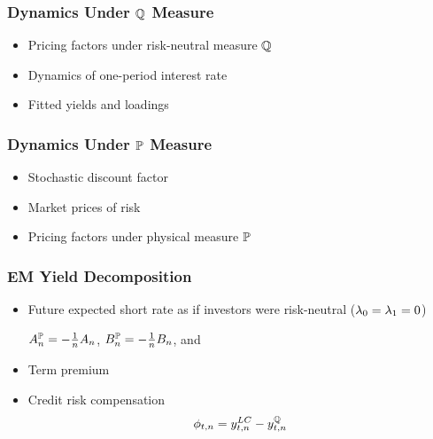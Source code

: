 \documentclass[12pt, aspectratio=169, xcolor=dvipsnames]{beamer}  %
\begin{document}
\begin{frame}[label=Qdynamics]
\frametitle{Dynamics Under \(\mathbb{Q}\) Measure}
\begin{itemize}
	\item Pricing factors under risk-neutral measure \(\mathbb{Q}\)
	
	\item Dynamics of one-period interest rate
	
	\item Fitted yields and loadings
	
\end{itemize}
\end{frame}

\begin{frame}[label=Pdynamics]
\frametitle{Dynamics Under \(\mathbb{P}\) Measure}
\begin{itemize}
\item Stochastic discount factor

\item Market prices of risk

\item Pricing factors under physical measure \(\mathbb{P}\)

\end{itemize}
\end{frame}

\begin{frame}[label=Components]
\frametitle{EM Yield Decomposition}
\begin{itemize}
\item Future expected short rate as if investors were risk-neutral (\(\lambda_{0} = \lambda_{1} = 0\))

\(A_{n}^{\mathbb{P}} = - \frac{1}{n} A_{n}\), \(B_{n}^{\mathbb{P}} = - \frac{1}{n} B_{n}\),  and 
\item Term premium

\item Credit risk compensation
\[\phi_{t,n} = y_{t,n} ^{LC} - y_{t,n}^{\mathbb{Q}}\]
\end{itemize}
\end{frame}
\end{document}
